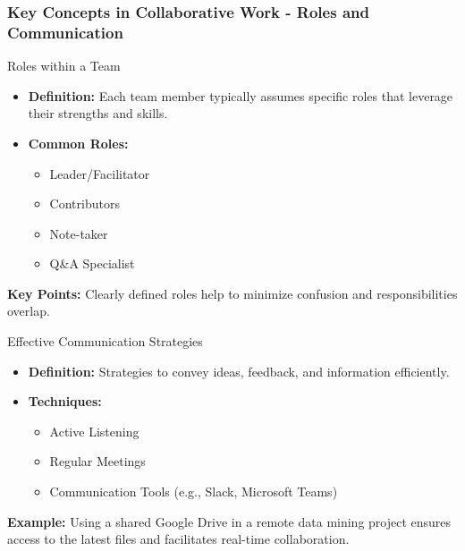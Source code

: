 \documentclass[aspectratio=169]{beamer}
\begin{document}
\begin{frame}[fragile]
  \frametitle{Key Concepts in Collaborative Work - Roles and Communication}
  \begin{block}{Roles within a Team}
    \begin{itemize}
      \item \textbf{Definition:} Each team member typically assumes specific roles that leverage their strengths and skills.
      \item \textbf{Common Roles:}
      \begin{itemize}
        \item Leader/Facilitator
        \item Contributors
        \item Note-taker
        \item Q\&A Specialist
      \end{itemize}
    \end{itemize}
    
    \textbf{Key Points:} Clearly defined roles help to minimize confusion and responsibilities overlap.
  \end{block}

  \begin{block}{Effective Communication Strategies}
    \begin{itemize}
      \item \textbf{Definition:} Strategies to convey ideas, feedback, and information efficiently.
      \item \textbf{Techniques:}
      \begin{itemize}
        \item Active Listening
        \item Regular Meetings
        \item Communication Tools (e.g., Slack, Microsoft Teams)
      \end{itemize}
    \end{itemize}
    
    \textbf{Example:} Using a shared Google Drive in a remote data mining project ensures access to the latest files and facilitates real-time collaboration.
  \end{block}
\end{frame}
\end{document}
